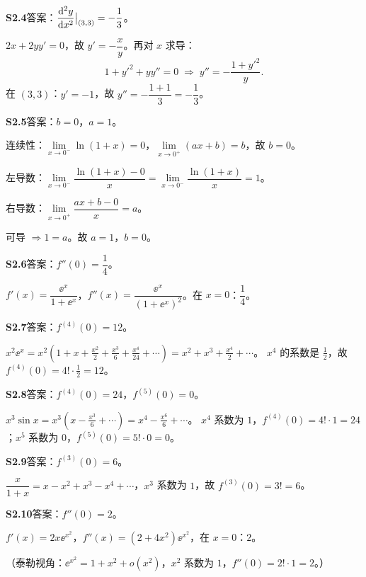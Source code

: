 \medskip
\noindent\textbf{S2.4}\quad 答案：$\dfrac{\mathrm{d}^{2}y}{\mathrm{d} x^{2}}\big|_{(3,3)}=-\dfrac{1}{3}$。

$2x+2yy'=0$，故 $y'=-\dfrac{x}{y}$。再对 $x$ 求导：
\[
1+y'^{2}+yy''=0\;\Longrightarrow\;y''=-\frac{1+y'^{2}}{y}.
\]
在 $(3,3)$：$y'=-1$，故 $y''=-\dfrac{1+1}{3}=-\dfrac{1}{3}$。

\medskip
\noindent\textbf{S2.5}\quad 答案：$b=0$，$a=1$。

连续性：$\lim\limits_{x\to0^-}\ln(1+x)=0$，$\lim\limits_{x\to0^+}(ax+b)=b$，故 $b=0$。

左导数：$\lim\limits_{x\to0^-}\dfrac{\ln(1+x)-0}{x}=\lim\limits_{x\to0^-}\dfrac{\ln(1+x)}{x}=1$。

右导数：$\lim\limits_{x\to0^+}\dfrac{ax+b-0}{x}=a$。

可导 $\Rightarrow 1=a$。故 $a=1$，$b=0$。

\medskip
\noindent\textbf{S2.6}\quad 答案：$f''(0)=\dfrac{1}{4}$。

$f'(x)=\dfrac{\ee^{x}}{1+\ee^{x}}$，$f''(x)=\dfrac{\ee^{x}}{(1+\ee^{x})^{2}}$。在 $x=0$：$\dfrac{1}{4}$。

\medskip
\noindent\textbf{S2.7}\quad 答案：$f^{(4)}(0)=12$。

$x^{2}\ee^{x}=x^{2}\left(1+x+\frac{x^{2}}2+\frac{x^{3}}6+\frac{x^{4}}{24}+\cdots\right)=x^{2}+x^{3}+\frac{x^{4}}2+\cdots$。
$x^{4}$ 的系数是 $\frac12$，故 $f^{(4)}(0)=4!\cdot\frac12=12$。

\medskip
\noindent\textbf{S2.8}\quad 答案：$f^{(4)}(0)=24$，$f^{(5)}(0)=0$。

$x^{3}\sin x=x^{3}\left(x-\frac{x^{3}}6+\cdots\right)=x^{4}-\frac{x^{6}}6+\cdots$。
$x^{4}$ 系数为 $1$，$f^{(4)}(0)=4!\cdot1=24$；$x^{5}$ 系数为 $0$，$f^{(5)}(0)=5!\cdot0=0$。

\medskip
\noindent\textbf{S2.9}\quad 答案：$f^{(3)}(0)=6$。

$\dfrac{x}{1+x}=x-x^{2}+x^{3}-x^{4}+\cdots$，$x^{3}$ 系数为 $1$，故 $f^{(3)}(0)=3!=6$。

\medskip
\noindent\textbf{S2.10}\quad 答案：$f''(0)=2$。

$f'(x)=2x\ee^{x^{2}}$，$f''(x)=(2+4x^{2})\ee^{x^{2}}$，在 $x=0$：$2$。

（泰勒视角：$\ee^{x^{2}}=1+x^{2}+o(x^{2})$，$x^{2}$ 系数为 $1$，$f''(0)=2!\cdot1=2$。）

